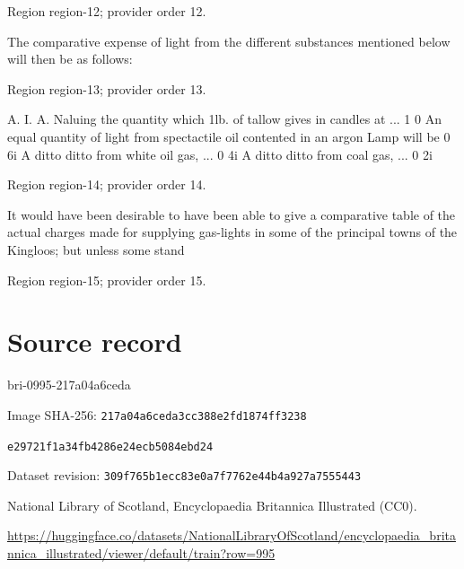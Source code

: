 \documentclass[11pt]{article}
\begin{document}
{\scriptsize\color{gray} Region region-12; provider order 12.\par}
\medskip

The comparative expense of light from the different substances mentioned below will then be as follows:
\par

{\scriptsize\color{gray} Region region-13; provider order 13.\par}
\medskip

A. I. A. Naluing the quantity which 1lb. of tallow gives in candles at ... 1 0 An equal quantity of light from spectactile oil contented in an argon Lamp will be 0 6i A ditto ditto from white oil gas, ... 0 4i A ditto ditto from coal gas, ... 0 2i
\par

{\scriptsize\color{gray} Region region-14; provider order 14.\par}
\medskip

It would have been desirable to have been able to give a comparative table of the actual charges made for supplying gas-lights in some of the principal towns of the Kingloos; but unless some stand
\par

{\scriptsize\color{gray} Region region-15; provider order 15.\par}
\medskip
\newpage\section*{Source record}
bri-0995-217a04a6ceda\par
Image SHA-256: \texttt{217a04a6ceda3cc388e2fd1874ff3238}\par\texttt{e29721f1a34fb4286e24ecb5084ebd24}\par
Dataset revision: \texttt{309f765b1ecc83e0a7f7}\texttt{762e44b4a927a7555443}\par
National Library of Scotland, Encyclopaedia Britannica Illustrated (CC0).\par
\url{https://huggingface.co/datasets/NationalLibraryOfScotland/encyclopaedia_britannica_illustrated/viewer/default/train?row=995}
\end{document}

